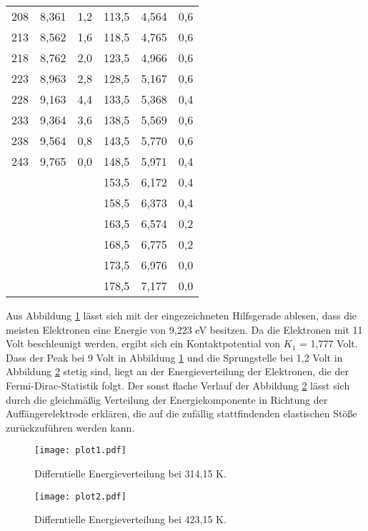 \begin{table}
\begin{tabular}{c c c | c c c}
    208 & 8,361  & 1,2 & 113,5 & 4,564 & 0,6 \\
    213 & 8,562  & 1,6 & 118,5 & 4,765 & 0,6 \\
    218 & 8,762  & 2,0 & 123,5 & 4,966 & 0,6 \\
    223 & 8,963  & 2,8 & 128,5 & 5,167 & 0,6 \\
    228 & 9,163  & 4,4 & 133,5 & 5,368 & 0,4 \\
    233 & 9,364  & 3,6 & 138,5 & 5,569 & 0,6 \\
    238 & 9,564  & 0,8 & 143,5 & 5,770 & 0,6 \\
    243 & 9,765  & 0,0 & 148,5 & 5,971 & 0,4 \\
        &        &     & 153,5 & 6,172 & 0,4 \\
        &        &     & 158,5 & 6,373 & 0,4 \\
        &        &     & 163,5 & 6,574 & 0,2 \\
        &        &     & 168,5 & 6,775 & 0,2 \\
        &        &     & 173,5 & 6,976 & 0,0 \\
        &        &     & 178,5 & 7,177 & 0,0 \\

    \bottomrule
  \end{tabular}
\end{table}
Aus Abbildung \ref{fig:plot1} lässt sich mit der eingezeichneten Hilfsgerade ablesen, dass die meisten Elektronen eine Energie von 9,223 eV besitzen.
Da die Elektronen mit 11 Volt beschleunigt werden, ergibt sich ein Kontaktpotential von $K_1$ = 1,777 Volt.
Dass der Peak bei 9 Volt in Abbildung \ref{fig:plot1} und die Sprungstelle bei 1,2 Volt in Abbildung \ref{fig:plot2} stetig sind, liegt an der Energieverteilung der Elektronen, die der Fermi-Dirac-Statistik folgt.
Der sonst flache Verlauf der Abbildung \ref{fig:plot2} lässt sich durch die gleichmäßig Verteilung der Energiekomponente in Richtung der Auffängerelektrode erklären, die auf die zufällig stattfindenden elastischen Stöße zurückzuführen werden kann.
\begin{figure}
  \centering
  \texttt{[image: plot1.pdf]}
  \caption{Differntielle Energieverteilung bei 314,15 K.}
  \label{fig:plot1}
\end{figure}
\begin{figure}
  \centering
  \texttt{[image: plot2.pdf]}
  \caption{Differntielle Energieverteilung bei 423,15 K.}
  \label{fig:plot2}
\end{figure}
\FloatBarrier

